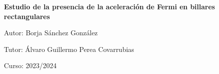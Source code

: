 \begin{titlepage}
\begin{center}
        \vspace{10mm}

        \textbf{\Huge Estudio de la presencia de la aceleración de Fermi en billares rectangulares}

        \vspace{10mm}

        \LARGE Autor: Borja Sánchez González
        
        \LARGE Tutor: Álvaro Guillermo Perea Covarrubias

        \vspace{20mm}

        \LARGE Curso: 2023/2024
             
    \end{center}
 \end{titlepage}

%